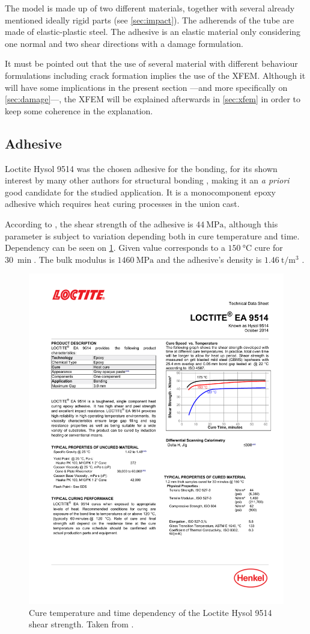 \documentclass[
documentsize = a4, %
font = cmr, %
typesize = 11, %
printmode = true,
onehalfspacing = true,
language = en, %
titlepage = udciccp, %
degree = pt, %
dedication = true,
acknowledgements = true,
abstract-en = true,
abstract-es = false,
abstract-ga = false,
epigraphs = true,
toc = true,
lof = true,
lot = true,
frontmatterintoc = false,
notation = false,
minimal = false,
]{UDCthesis}
\begin{document}
The model is made up of two different materials, together with several already mentioned ideally rigid parts (see \cref{sec:impact}). The adherends of the tube are made of elastic-plastic steel. The adhesive is an elastic material only considering one normal and two shear directions with a damage formulation.

It must be pointed out that the use of several material with different behaviour formulations including crack formation implies the use of the \gls{XFEM}. Although it will have some implications in the present section ---and more specifically on \cref{sec:damage}---, the \gls{XFEM} will be explained afterwards in \cref{sec:xfem} in order to keep some coherence in the explanation.

\subsection{Adhesive}
Loctite Hysol 9514 \citep{manufCatalog} was the chosen adhesive for the bonding, for its shown interest by many other authors for structural bonding \citep{Sadowski2010, Scattina2011, SernaMoreno2015}, making it an \textit{a priori} good candidate for the studied application. It is a monocomponent epoxy adhesive which requires heat curing processes in the union cast.

According to \citet{manufCatalog}, the shear strength of the adhesive is $\SI{44}{\MPa}$, although this parameter is subject to variation depending both in cure temperature and time. Dependency can be seen on \cref{fig:catalog_temp}. Given value corresponds to a $\SI{150}{\celsius}$ cure for $\SI{30}{\min}$. The bulk modulus is $\SI{1460}{\MPa}$ and the adhesive's density is $\SI{1.46}{\tonne/\m^3}$ \citep{manufCatalog}.

\begin{figure}
	\centering
	\includegraphics[width=0.7\linewidth]{IMG_CUTRES/catalog_temp}
	\caption[Cure temperature and time dependency of the Loctite Hysol 9514 shear strength.]{Cure temperature and time dependency of the Loctite Hysol 9514 shear strength. Taken from \citet{manufCatalog}.}
	\label{fig:catalog_temp}
\end{figure}
\end{document}
